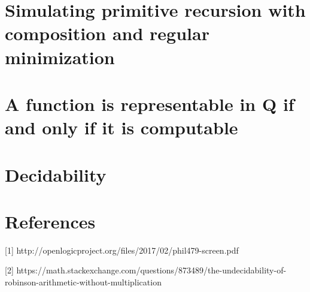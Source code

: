 \documentclass{article}
\begin{document}
\section{Simulating primitive recursion with composition and regular minimization}

\section{A function is representable in $\mathbf{Q}$ if and only if it is computable}

\section{Decidability}

\section{References}
[1] http://openlogicproject.org/files/2017/02/phil479-screen.pdf


[2] https://math.stackexchange.com/questions/873489/the-undecidability-of-robinson-arithmetic-without-multiplication
\end{document}
